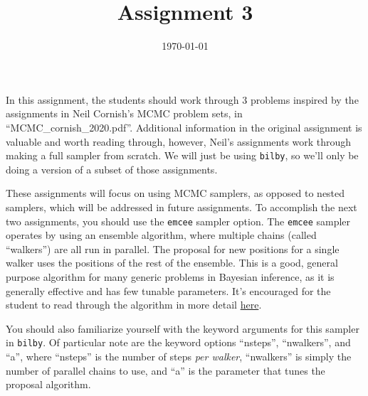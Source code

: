 \documentclass[
    aps,
    10pt,
    prd,
    notitlepage,
    onecolumn,s
    tightenlines,
    nofootinbib]{revtex4-1}
\newcommand{\software}[1]{\texttt{#1}}
\begin{document}
\title{Assignment 3}
\date{\today}
\maketitle

In this assignment, the students should work through 3 problems inspired by the assignments in Neil Cornish's MCMC problem sets, in ``MCMC\_cornish\_2020.pdf''.
Additional information in the original assignment is valuable and worth reading through, however, Neil's assignments work through making a full sampler from scratch. 
We will just be using \software{bilby}, so we'll only be doing a version of a subset of those assignments.

These assignments will focus on using MCMC samplers, as opposed to nested samplers, which will be addressed in future assignments.
To accomplish the next two assignments, you should use the \software{emcee} sampler option.
The \software{emcee} sampler operates by using an ensemble algorithm, where multiple chains (called ``walkers'') are all run in parallel. 
The proposal for new positions for a single walker uses the positions of the rest of the ensemble. 
This is a good, general purpose algorithm for many generic problems in Bayesian inference, as it is generally effective and has few tunable parameters.
It's encouraged for the student to read through the algorithm in more detail \href{https://arxiv.org/abs/1202.3665}{here}.

You should also familiarize yourself with the keyword arguments for this sampler in \software{bilby}.
Of particular note are the keyword options ``nsteps'', ``nwalkers'', and ``a'', where ``nsteps'' is the number of steps \emph{per walker}, ``nwalkers'' is simply the number of parallel chains to use, and ``a'' is the parameter that tunes the proposal algorithm.
\end{document}
